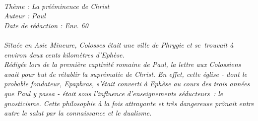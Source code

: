 \BFont
\noindent\hrulefill
{\footnotesize
\textit{
\bigskip
{\centering{}
\\Thème : La prééminence de Christ
\\Auteur : Paul
\\Date de rédaction : Env. 60\\}
}
\textit{
\\Située en Asie Mineure, Colosses était une ville de Phrygie et se trouvait à environ deux cents kilomètres d’Ephèse.
\\Rédigée lors de la première captivité romaine de Paul, la lettre aux Colossiens avait pour but de rétablir la suprématie de Christ. En effet, cette église - dont le probable fondateur, Epaphras, s’était converti à Ephèse au cours des trois années que Paul y passa - était sous l’influence d’enseignements séducteurs : le gnosticisme. Cette philosophie à la fois attrayante et très dangereuse prônait entre autre le salut par la connaissance et le dualisme.\bigskip
}
}
\par\nobreak\noindent\hrulefill
